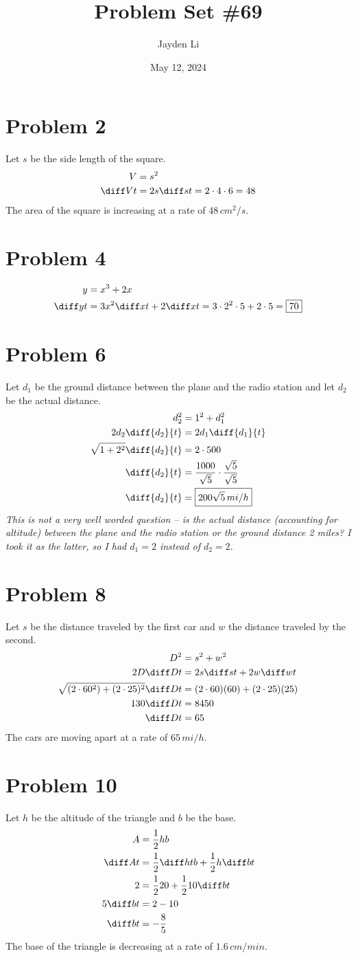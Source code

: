 \documentclass[preview, margin=0.6in]{standalone}
\title{\vspace*{-30pt}Problem Set \#69}
\author{Jayden Li}
\date{May 12, 2024}
\newcommand*{\problem}[1]{\section*{Problem #1}}
\begin{document}
\fontsize{12pt}{12pt}\selectfont
\setlength{\abovedisplayskip}{0pt}
\maketitle

\problem{2}
Let $s$ be the side length of the square.
\begin{align*}
	V&=s^2 \\
	\diff Vt&=2s\diff st
	=2\cdot4\cdot6
	=48
\end{align*}
The area of the square is increasing at a rate of $48\,cm^2/s$.

\problem{4}
\begin{align*}
	y&=x^3+2x \\
	\diff yt&=3x^2\diff xt+2\diff xt
	=3\cdot2^2\cdot5+2\cdot5=\boxed{70}
\end{align*}

\problem{6}
Let $d_1$ be the ground distance between the plane and the radio station and let $d_2$ be the actual distance.
\begin{align*}
	d_2^2&=1^2+d_1^2 \\
	2d_2\diff{d_2}{t}&=2d_1\diff{d_1}{t} \\
	\sqrt{1+2^2}\diff{d_2}{t}&=2\cdot500 \\
	\diff{d_2}{t}&=\frac{1000}{\sqrt{5}}\cdot\frac{\sqrt{5}}{\sqrt{5}} \\
	\diff{d_2}{t}&=\boxed{200\sqrt{5}\,mi/h}
\end{align*}
\textit{This is not a very well worded question -- is the actual distance (accounting for altitude) between the plane and the radio station or the ground distance 2 miles? I took it as the latter, so I had $d_1=2$ instead of $d_2=2$.}

\problem{8}
Let $s$ be the distance traveled by the first car and $w$ the distance traveled by the second.
\begin{align*}
	D^2&=s^2+w^2 \\
	2D\diff Dt&=2s\diff st+2w\diff wt \\
	\sqrt{(2\cdot60^2)+(2\cdot25)^2}\diff Dt&=(2\cdot60)(60)+(2\cdot25)(25) \\
	130\diff Dt&=8450 \\
	\diff Dt&=65
\end{align*}
The cars are moving apart at a rate of $65\,mi/h$.

\problem{10}
Let $h$ be the altitude of the triangle and $b$ be the base.
\begin{align*}
	A&=\frac12hb \\
	\diff At&=\frac12 \diff ht b+\frac12 h \diff bt \\
	2&=\frac12 20+\frac12 10 \diff bt \\
	5\diff bt&=2-10 \\
	\diff bt&=-\frac85
\end{align*}
The base of the triangle is decreasing at a rate of $1.6\,cm/min$.
\end{document}
